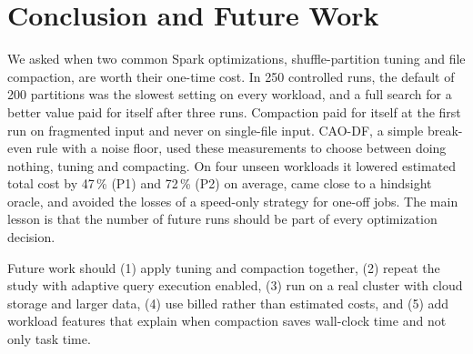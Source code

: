 \section{Conclusion and Future Work}
\label{sec:conclusion}

We asked when two common Spark optimizations, shuffle-partition tuning and file compaction,
are worth their one-time cost. In 250 controlled runs, the default of 200 partitions was the
slowest setting on every workload, and a full search for a better value paid for itself after
three runs. Compaction paid for itself at the first run on fragmented input and never on
single-file input. CAO-DF, a simple break-even rule with a noise floor, used these measurements
to choose between doing nothing, tuning and compacting. On four unseen workloads it lowered
estimated total cost by 47\,\% (P1) and 72\,\% (P2) on average, came close to a hindsight
oracle, and avoided the losses of a speed-only strategy for one-off jobs. The main lesson is
that the number of future runs should be part of every optimization decision.

Future work should (1) apply tuning and compaction together, (2) repeat the study with adaptive
query execution enabled, (3) run on a real cluster with cloud storage and larger data, (4) use
billed rather than estimated costs, and (5) add workload features that explain when compaction
saves wall-clock time and not only task time.
